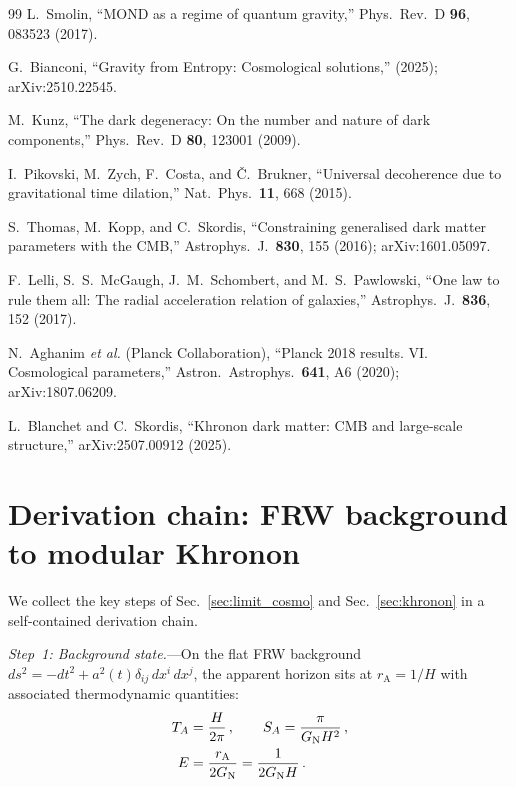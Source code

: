 \documentclass[prd,twocolumn,superscriptaddress,longbibliography,floatfix]{revtex4-2}
\newcommand{\GN}{G_{\mathrm{N}}}
\newcommand{\rA}{r_{\mathrm{A}}}
\begin{document}
\begin{thebibliography}{99}
L.~Smolin,
``MOND as a regime of quantum gravity,''
Phys.\ Rev.\ D \textbf{96}, 083523 (2017).

G.~Bianconi,
``Gravity from Entropy: Cosmological solutions,''
(2025); arXiv:2510.22545.

M.~Kunz,
``The dark degeneracy: On the number and nature of
dark components,''
Phys.\ Rev.\ D \textbf{80}, 123001 (2009).

I.~Pikovski, M.~Zych, F.~Costa, and \v{C}.~Brukner,
``Universal decoherence due to gravitational time
dilation,''
Nat.\ Phys.\ \textbf{11}, 668 (2015).

S.~Thomas, M.~Kopp, and C.~Skordis,
``Constraining generalised dark matter parameters with
the CMB,''
Astrophys.\ J.\ \textbf{830}, 155 (2016);
arXiv:1601.05097.

F.~Lelli, S.~S.~McGaugh, J.~M.~Schombert, and
M.~S.~Pawlowski,
``One law to rule them all: The radial acceleration
relation of galaxies,''
Astrophys.\ J.\ \textbf{836}, 152 (2017).

N.~Aghanim \textit{et al.} (Planck Collaboration),
``Planck 2018 results. VI. Cosmological parameters,''
Astron.\ Astrophys.\ \textbf{641}, A6 (2020);
arXiv:1807.06209.

L.~Blanchet and C.~Skordis,
``Khronon dark matter: CMB and large-scale structure,''
arXiv:2507.00912 (2025).

\end{thebibliography}


\appendix
\section{Derivation chain: FRW background to modular Khronon}
\label{app:derivation}

We collect the key steps of Sec.~\ref{sec:limit_cosmo}
and Sec.~\ref{sec:khronon} in a self-contained
derivation chain.

\emph{Step~1: Background state.}---On the flat FRW
background
$ds^2 = -dt^2 + a^2(t)\delta_{ij}\,dx^i\,dx^j$,
the apparent horizon sits at $\rA = 1/H$ with
associated thermodynamic quantities:
\begin{align}
T_A &= \frac{H}{2\pi}\,,\qquad
S_A = \frac{\pi}{\GN H^2}\,,\notag\\
E &= \frac{\rA}{2\GN} = \frac{1}{2\GN H}\,.
\label{eq:app_background}
\end{align}
\end{document}
